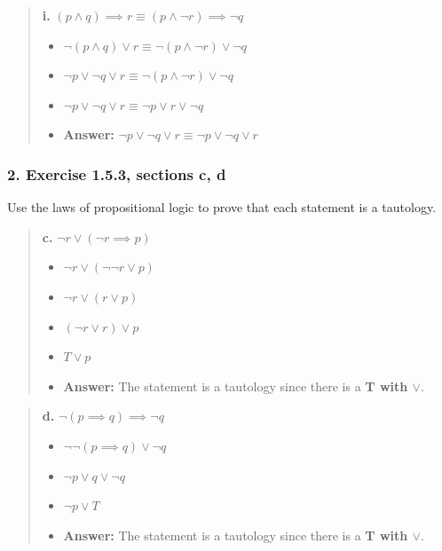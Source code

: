 \documentclass[11pt, oneside]{article}
\begin{document}
\begin{quote}
    \textbf{i. }$(p \land q) \implies r \equiv (p \land \neg r) \implies \neg q$

    \begin{itemize}
        \item $\neg (p \land q) \lor r \equiv \neg (p \land \neg r) \lor \neg q$
        \item $\neg p \lor \neg q \lor r \equiv \neg (p \land \neg r) \lor \neg q$
        \item $\neg p \lor \neg q \lor r \equiv \neg p \lor r \lor \neg q$
        \item \textbf{Answer:} $\neg p \lor \neg q \lor r \equiv \neg p \lor \neg q \lor r$
    \end{itemize}
\end{quote}

\subsubsection*{2. Exercise 1.5.3, sections c, d}

Use the laws of propositional logic to prove that each statement is a tautology.

\begin{quote}
    \textbf{c. }$\neg r \lor (\neg r \implies p)$

    \begin{itemize}
        \item $\neg r \lor (\neg \neg r \lor p)$
        \item $\neg r \lor (r \lor p)$
        \item $(\neg r \lor r) \lor p$
        \item $T \lor p$
        \item \textbf{Answer:} The statement is a tautology since there is a \textbf{T with $\lor$}.
    \end{itemize}
\end{quote}

\begin{quote}
    \textbf{d. }$\neg (p \implies q) \implies \neg q$

    \begin{itemize}
        \item $\neg \neg (p \implies q) \lor \neg q$
        \item $\neg p \lor q \lor \neg q$
        \item $\neg p \lor T$
        \item \textbf{Answer:} The statement is a tautology since there is a \textbf{T with $\lor$}.
    \end{itemize}
\end{quote}
\end{document}
